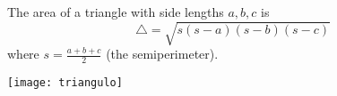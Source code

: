 \documentclass[12pt]{article}
\begin{document}
The area of a triangle with side lengths $a,b,c$ is 
$$\triangle=\sqrt{s(s-a)(s-b)(s-c)}$$
where $s=\frac{a+b+c}{2}$ (the semiperimeter).

\begin{center}
\texttt{[image: triangulo]}
\end{center}
\end{document}
